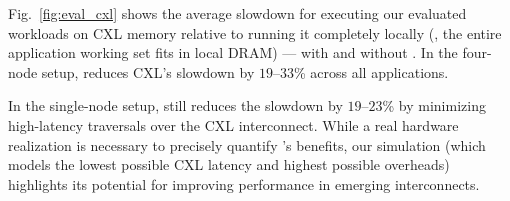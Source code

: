  
Fig.~\ref{fig:eval_cxl} shows the average slowdown for executing our evaluated workloads on CXL memory relative to running it completely locally (\ie, the entire application working set fits in local DRAM) --- with and without \pulse. In the four-node setup, \pulse reduces CXL's slowdown by $19$--$33$\% across all applications. 

In the single-node setup, \pulse still reduces the slowdown by $19$--$23$\% by minimizing high-latency traversals over the CXL interconnect. While a real hardware realization is necessary to precisely quantify \pulse's benefits, our simulation (which models the lowest possible CXL latency and highest possible \pulse overheads) highlights its potential for improving performance in emerging interconnects.

